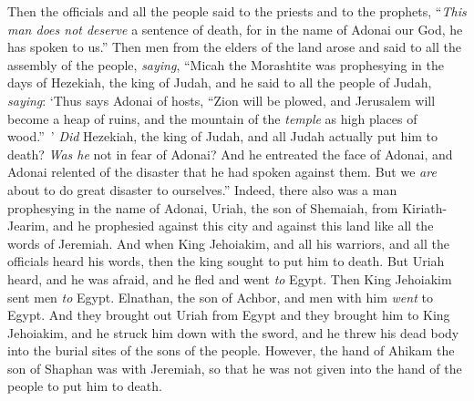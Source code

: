 \begin{biblechapter}
\verse Then the officials and all the people said to the priests and to the prophets, “\textit{This man does not deserve} a sentence of death, for in the name of Adonai our God, he has spoken to us.”
\verse Then men from the elders of the land arose and said to all the assembly of the people, \textit{saying},
\verse “Micah the Morashtite was prophesying in the days of Hezekiah, the king of Judah, and he said to all the people of Judah, \textit{saying}: ‘Thus says Adonai of hosts, 
“Zion will be plowed, 
and Jerusalem will become a heap of ruins, 
and the mountain of the \textit{temple} as high places of wood.” ’
\verse \textit{Did} Hezekiah, the king of Judah, and all Judah actually put him to death? \textit{Was he} not in fear of Adonai? And he entreated the face of Adonai, and Adonai relented of the disaster that he had spoken against them. But we \textit{are} about to do great disaster to ourselves.”
\verse Indeed, there also was a man prophesying in the name of Adonai, Uriah, the son of Shemaiah, from Kiriath-Jearim, and he prophesied against this city and against this land like all the words of Jeremiah.
\verse And when King Jehoiakim, and all his warriors, and all the officials heard his words, then the king sought to put him to death. But Uriah heard, and he was afraid, and he fled and went \textit{to} Egypt.
\verse Then King Jehoiakim sent men \textit{to} Egypt. Elnathan, the son of Achbor, and men with him \textit{went} to Egypt.
\verse And they brought out Uriah from Egypt and they brought him to King Jehoiakim, and he struck him down with the sword, and he threw his dead body into the burial sites of the sons of the people.
\verse However, the hand of Ahikam the son of Shaphan was with Jeremiah, so that he was not given into the hand of the people to put him to death.
\end{biblechapter}

